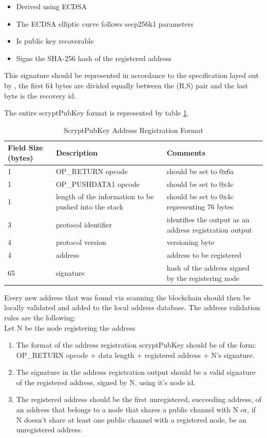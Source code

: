 \begin{itemize}
  \item Derived using ECDSA
  \item The ECDSA elliptic curve follows secp256k1 parameters
  \item Is public key recoverable
  \item Signs the SHA-256 hash of the registered address
\end{itemize}

This signature should be represented in accordance to the specification layed out by \cite{libsecp256k1}, the first 64 bytes are divided equally between the (R,S) pair and the last byte is the recovery id.

 The entire scryptPubKey format is represented by table \ref{table:reg_format}. \\

\begin{table}[H]
\label{table:reg_format}
\begin{tabular}{|l|l|l|}
\hline
\rowcolor[HTML]{C0C0C0} 
Field Size (bytes) & Description & Comments \\ \hline
1 & OP\_RETURN opcode & should be set to 0x6a \\ \hline
1 & OP\_PUSHDATA1 opcode & should be set to 0x4c \\ \hline 
1 & length of the information to be pushed into the stack & should be set to 0x4c representing 76 bytes \\ \hline
3 & protocol identifier & identifies the output as an address registration output \\ \hline
4 & protocol version & versioning byte \\ \hline
4 & address & address to be registered \\ \hline
65 & signature & hash of the address signed by the registering node\\ \hline
\end{tabular}
\caption{ScryptPubKey Address Registration Format}
\end{table}

Every new address that was found via scanning the blockchain should then be locally validated and added to the local address database. The address validation rules are the following: \\

Let N be the node registering the address
\begin{enumerate}

\item The format of the address registration scryptPubKey should be of the form: OP\_RETURN opcode + data length + registered address + N's signature.
\item The signature in the address registration output should be a valid signature of the registered address, signed by N, using it's node id.
\item The registered address should be the first unregistered, succeeding address, of an address that belongs to a node that shares a public channel with N or, if N doesn't share at least one public channel with a registered node, be an unregistered address.

\end{enumerate}

